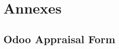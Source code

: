 \documentclass[a4paper,10pt]{report}
\begin{document}
\part*{Annexes}
\lhead{\nouppercase{\leftmark}}
\appendix %


\chapter{Odoo Appraisal Form}


\end{document}
